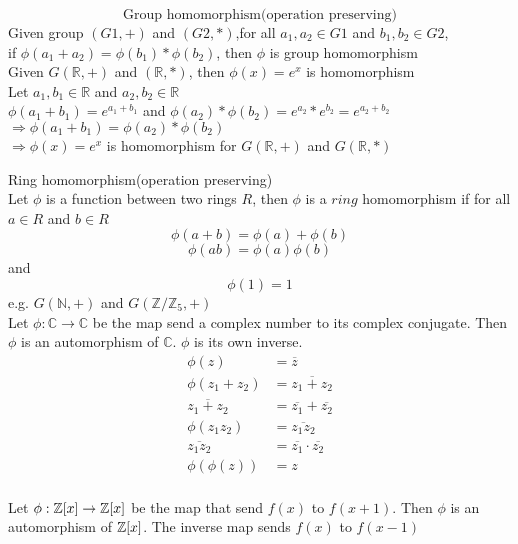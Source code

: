 \documentclass[10pt]{article}
\newcommand{\polyring}[2][Z]{\mathbb{#1}\scalebox{1}[.95]{[}#2\scalebox{1}[.95]{]}}
\begin{document}
\[\text{Group homomorphism(operation preserving)}\]
Given group $(G1, +)$ and $(G2, *)$,for all $a_1, a_2 \in G1$ and $b_1, b_2 \in G2$,\\
if $\phi(a_1 + a_2) = \phi(b_1)*\phi(b_2)$, then $\phi$ is group homomorphism\\

Given $G(\mathbb{R}, +)$ and $(\mathbb{R}, *)$, then $\phi(x) = e^x$ is homomorphism\\ 
Let $a_1, b_1 \in \mathbb{R}$ and $a_2, b_2 \in \mathbb{R}$\\ 
$\phi(a_1+b_1) = e^{a_1 + b_1}$ and $\phi(a_2)*\phi(b_2) = e^{a_2}*e^{b_2} = e^{a_2+b_2}$\\
$\Rightarrow \phi(a_1 + b_1) = \phi(a_2)*\phi(b_2)$\\
$\Rightarrow \phi(x) = e^{x}$ is homomorphism for $G(\mathbb{R}, +)$ and $G(\mathbb{R}, *)$



Ring homomorphism(operation preserving)\\
Let $\phi$ is a function between two rings $R$, then $\phi$ is a $\mathit{ring}$ homomorphism if
for all $a \in R$ and $b \in R$ 
\[\phi(a+b) = \phi(a) + \phi(b)\] 
\[\phi(ab) = \phi(a)\phi(b)\]
and \[\phi(1) = 1\]
e.g. $G(\mathbb{N}, +)$ and $G(\mathbb{Z}/\mathbb{Z}_5, +)$\\

Let $\phi: \mathbb{C} \rightarrow \mathbb{C}$ be the map send a complex number to its complex conjugate. Then $\phi$ is an automorphism of $\mathbb{C}$. 
$\phi$ is its own inverse.\\

\begin{equation}
\begin{aligned}
\phi(z) &= \overline{z}\\
\phi(z_1 + z_2) &= \overline{z_1 + z_2}\\
\overline{z_1 + z_2} &= \overline{z_1} + \overline{z_2}\\
\phi(z_1 z_2) &= \overline{z_1 z_2}\\
\overline{z_1 z_2} &= \overline{z_1} \cdot \overline{z_2} \nonumber\\
\phi(\phi(z)) &= z\\
\end{aligned}
\end{equation}

Let $\phi: \polyring{x} \rightarrow  \polyring{x}$ be the map that send $f(x)$ to $f(x+1)$. Then $\phi$ is an automorphism of $\polyring{x}$.   
The inverse map sends $f(x)$ to $f(x-1)$\\
\end{document}
